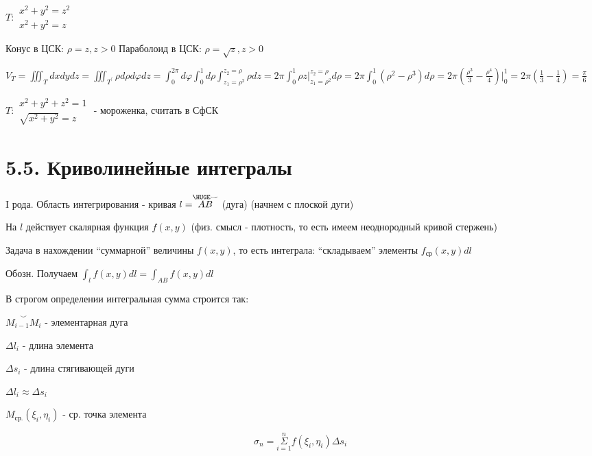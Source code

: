 \documentclass[12pt]{article}
\begin{document}
    \Ex $T: \begin{matrix}x^2 + y^2 = z^2 \\ x^2 + y^2 = z\end{matrix}$

    Конус в ЦСК: $\rho = z, z > 0$
    Параболоид в ЦСК: $\rho = \sqrt{z}, z > 0$

    $V_T = \iiint_T dxdydz = \iiint_{T^\prime}\rho d\rho d\varphi dz = \int_0^{2\pi} d\varphi \int_0^1 d \rho \int_{z_1 = \rho^2}^{z_2=\rho} \rho dz =
    2\pi \int_0^1 \rho z \Big|_{z_1 = \rho^2}^{z_2=\rho} d\rho = 2\pi \int_0^1 (\rho^2 - \rho^3) d\rho =
    2\pi (\frac{\rho^3}{3} - \frac{\rho^4}{4}) \Big|_0^1 = 2\pi (\frac{1}{3} - \frac{1}{4}) = \frac{\pi}{6}$

    \Lab $T: \begin{matrix}x^2 + y^2 + z^2 = 1 \\ \sqrt{x^2 + y^2} = z\end{matrix}$ - мороженка, считать в СфСК


    \section{5.5. Криволинейные интегралы}

    I рода. Область интегрирования - кривая $l = \stackrel{\HUGE\smile}{AB}$ (дуга) (начнем с плоской дуги)

    На $l$ действует скалярная функция $f(x, y)$ (физ. смысл - плотность, то есть имеем неоднородный кривой стержень)

    Задача в нахождении \enquote{суммарной} величины $f(x, y)$, то есть интеграла: \enquote{складываем} элементы $f_{\text{ср}}(x, y) dl$


    Обозн. Получаем $\int_l f(x, y)dl = \int_{AB} f(x, y)dl$



    \Nota В строгом определении интегральная сумма строится так:

    $\overset{\smile}{M_{i-1}M_i}$ - элементарная дуга

    $\Delta l_i$ - длина элемента

    $\Delta s_i$ - длина стягивающей дуги

    $\Delta l_i \approx \Delta s_i$

    $M_{\text{ср.}}(\xi_i, \eta_i)$ - ср. точка элемента

    \[\sigma_n = \overset{n}{\underset{i = 1}{\Sigma}} f(\xi_i, \eta_i) \Delta s_i\]

    \vspace{10mm}
\end{document}
